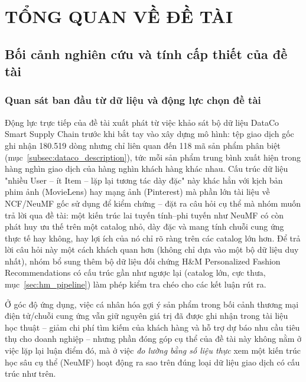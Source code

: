 \chapter{TỔNG QUAN VỀ ĐỀ TÀI}
\label{chap:tongquan}

\section{Bối cảnh nghiên cứu và tính cấp thiết của đề tài}
\label{sec:boicanh}

\subsection{Quan sát ban đầu từ dữ liệu và động lực chọn đề tài}
\label{subsec:thuctrang}

Động lực trực tiếp của đề tài xuất phát từ việc khảo sát bộ dữ liệu DataCo Smart Supply Chain \parencite{dataco2019} trước khi bắt tay vào xây dựng mô hình: tệp giao dịch gốc ghi nhận 180.519 dòng nhưng chỉ liên quan đến 118 mã sản phẩm phân biệt (mục~\ref{subsec:dataco_description}), tức mỗi sản phẩm trung bình xuất hiện trong hàng nghìn giao dịch của hàng nghìn khách hàng khác nhau. Cấu trúc dữ liệu "nhiều User -- ít Item -- lặp lại tương tác dày đặc" này khác hẳn với kịch bản phim ảnh (MovieLens) hay mạng ảnh (Pinterest) mà phần lớn tài liệu về NCF/NeuMF gốc \parencite{he2017ncf} sử dụng để kiểm chứng -- đặt ra câu hỏi cụ thể mà nhóm muốn trả lời qua đề tài: một kiến trúc lai tuyến tính--phi tuyến như NeuMF có còn phát huy ưu thế trên một catalog nhỏ, dày đặc và mang tính chuỗi cung ứng thực tế hay không, hay lợi ích của nó chỉ rõ ràng trên các catalog lớn hơn. Để trả lời câu hỏi này một cách khách quan hơn (không chỉ dựa vào một bộ dữ liệu duy nhất), nhóm bổ sung thêm bộ dữ liệu đối chứng H\&M Personalized Fashion Recommendations có cấu trúc gần như ngược lại (catalog lớn, cực thưa, mục~\ref{sec:hm_pipeline}) làm phép kiểm tra chéo cho các kết luận rút ra.

Ở góc độ ứng dụng, việc cá nhân hóa gợi ý sản phẩm trong bối cảnh thương mại điện tử/chuỗi cung ứng vẫn giữ nguyên giá trị đã được ghi nhận trong tài liệu học thuật -- giảm chi phí tìm kiếm của khách hàng và hỗ trợ dự báo nhu cầu tiêu thụ cho doanh nghiệp \parencite{schafer2001commerce, linden2003amazon} -- nhưng phần đóng góp cụ thể của đề tài này không nằm ở việc lặp lại luận điểm đó, mà ở việc \emph{đo lường bằng số liệu thực} xem một kiến trúc học sâu cụ thể (NeuMF) hoạt động ra sao trên đúng loại dữ liệu giao dịch có cấu trúc như trên.

